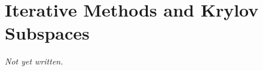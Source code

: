 \chapter{Iterative Methods and Krylov Subspaces}\label{ch:krylov-methods}


\textit{Not yet written.}
